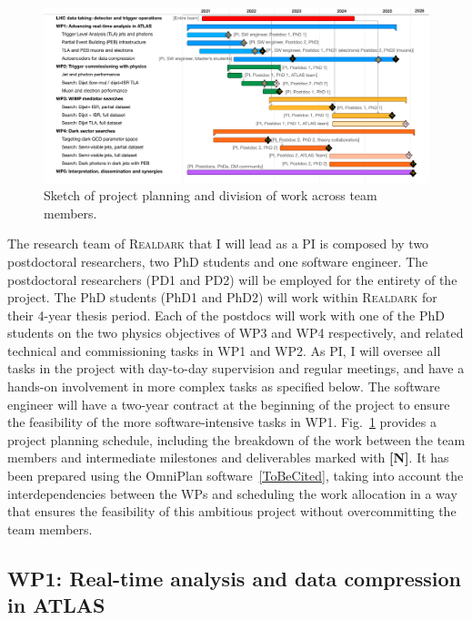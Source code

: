 \begin{figure}[!htpb] 
\begin{center}
\includegraphics[width=\textwidth]{figs_B2/gantt}
\caption{\color{black}\label{fig:gantt} \small Sketch of project planning and division of work across team members.} 
\vskip2pt
\end{center}
\end{figure}

The research team of \textsc{Realdark} that I will lead as a PI is composed by two postdoctoral researchers, two PhD students and one software engineer.
The postdoctoral researchers (PD1 and PD2) will be employed for the entirety of the project. 
The PhD students (PhD1 and PhD2) will work within \textsc{Realdark} for their 4-year thesis period. 
Each of the postdocs will work with one of the PhD students on the two physics objectives of WP3 and WP4 respectively, and related technical and commissioning tasks in WP1 and WP2. 
As PI, I will oversee all tasks in the project with day-to-day supervision and regular meetings, and have a hands-on involvement in more complex tasks as specified below. 
The software engineer will have a two-year contract at the beginning of the project to ensure the feasibility of the more software-intensive tasks in WP1. 
Fig.~\ref{fig:gantt} provides a project planning schedule, including the breakdown of the work between the team members and intermediate milestones and deliverables marked with \textbf{[N]}. 
It has been prepared using the OmniPlan software~\ref{ToBeCited},%
taking into account the interdependencies between the WPs and 
scheduling the work allocation in a way that ensures the feasibility of this ambitious project without overcommitting the team members. 

\subsection{WP1: Real-time analysis and data compression in ATLAS}

